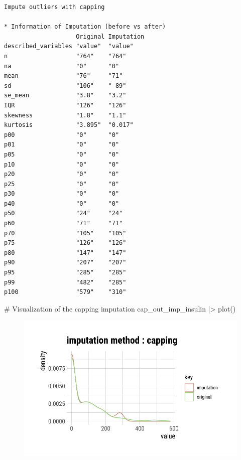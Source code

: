 \documentclass[
  letterpaper,
  DIV=11,
  numbers=noendperiod]{scrreprt}
\newenvironment{Shaded}{\begin{snugshade}}{\end{snugshade}}
\newcommand{\CommentTok}[1]{\textcolor[rgb]{0.37,0.37,0.37}{#1}}
\newcommand{\FunctionTok}[1]{\textcolor[rgb]{0.28,0.35,0.67}{#1}}
\newcommand{\NormalTok}[1]{\textcolor[rgb]{0.00,0.23,0.31}{#1}}
\newcommand{\SpecialCharTok}[1]{\textcolor[rgb]{0.37,0.37,0.37}{#1}}
\begin{document}
\begin{verbatim}
Impute outliers with capping

* Information of Imputation (before vs after)
                    Original Imputation
described_variables "value"  "value"   
n                   "764"    "764"     
na                  "0"      "0"       
mean                "76"     "71"      
sd                  "106"    " 89"     
se_mean             "3.8"    "3.2"     
IQR                 "126"    "126"     
skewness            "1.8"    "1.1"     
kurtosis            "3.895"  "0.017"   
p00                 "0"      "0"       
p01                 "0"      "0"       
p05                 "0"      "0"       
p10                 "0"      "0"       
p20                 "0"      "0"       
p25                 "0"      "0"       
p30                 "0"      "0"       
p40                 "0"      "0"       
p50                 "24"     "24"      
p60                 "71"     "71"      
p70                 "105"    "105"     
p75                 "126"    "126"     
p80                 "147"    "147"     
p90                 "207"    "207"     
p95                 "285"    "285"     
p99                 "482"    "285"     
p100                "579"    "310"     
\end{verbatim}

\begin{Shaded}
\begin{Highlighting}[]
\CommentTok{\# Visualization of the capping imputation}
\NormalTok{cap\_out\_imp\_insulin }\SpecialCharTok{|\textgreater{}}
  \FunctionTok{plot}\NormalTok{()}
\end{Highlighting}
\end{Shaded}

\begin{figure}[H]

{\centering \includegraphics{./ImputatingLikeDataScientist_files/figure-pdf/unnamed-chunk-18-1.pdf}

}

\end{figure}
\end{document}
